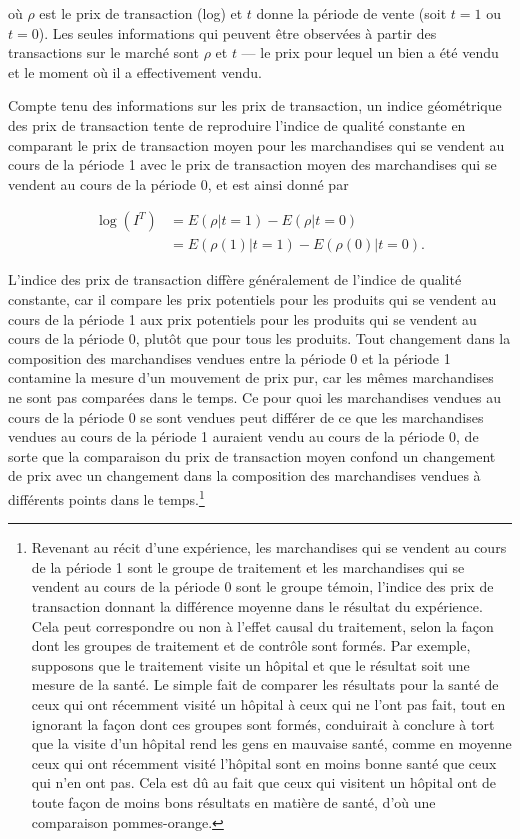 \documentclass[
]{article}
\begin{document}
où \(\rho\) est le prix de transaction (log) et \(t\) donne la période de vente (soit \(t = 1\) ou \(t = 0\)). Les seules informations qui peuvent être observées à partir des transactions sur le marché sont \(\rho\) et \(t\) --- le prix pour lequel un bien a été vendu et le moment où il a effectivement vendu.

Compte tenu des informations sur les prix de transaction, un indice géométrique des prix de transaction tente de reproduire l'indice de qualité constante en comparant le prix de transaction moyen pour les marchandises qui se vendent au cours de la période 1 avec le prix de transaction moyen des marchandises qui se vendent au cours de la période 0, et est ainsi donné par

\begin{align*}
\log (I^{T}) &= E(\rho | t = 1) - E(\rho | t = 0) \\
&= E(\rho(1) | t = 1) - E(\rho(0) | t = 0).
\end{align*}

L'indice des prix de transaction diffère généralement de l'indice de qualité constante, car il compare les prix potentiels pour les produits qui se vendent au cours de la période 1 aux prix potentiels pour les produits qui se vendent au cours de la période 0, plutôt que pour tous les produits. Tout changement dans la composition des marchandises vendues entre la période 0 et la période 1 contamine la mesure d'un mouvement de prix pur, car les mêmes marchandises ne sont pas comparées dans le temps. Ce pour quoi les marchandises vendues au cours de la période 0 se sont vendues peut différer de ce que les marchandises vendues au cours de la période 1 auraient vendu au cours de la période 0, de sorte que la comparaison du prix de transaction moyen confond un changement de prix avec un changement dans la composition des marchandises vendues à différents points dans le temps.\footnote{Revenant au récit d'une expérience, les marchandises qui se vendent au cours de la période 1 sont le groupe de traitement et les marchandises qui se vendent au cours de la période 0 sont le groupe témoin, l'indice des prix de transaction donnant la différence moyenne dans le résultat du expérience. Cela peut correspondre ou non à l'effet causal du traitement, selon la façon dont les groupes de traitement et de contrôle sont formés. Par exemple, supposons que le traitement visite un hôpital et que le résultat soit une mesure de la santé. Le simple fait de comparer les résultats pour la santé de ceux qui ont récemment visité un hôpital à ceux qui ne l'ont pas fait, tout en ignorant la façon dont ces groupes sont formés, conduirait à conclure à tort que la visite d'un hôpital rend les gens en mauvaise santé, comme en moyenne ceux qui ont récemment visité l'hôpital sont en moins bonne santé que ceux qui n'en ont pas. Cela est dû au fait que ceux qui visitent un hôpital ont de toute façon de moins bons résultats en matière de santé, d'où une comparaison pommes-orange.}
\end{document}
